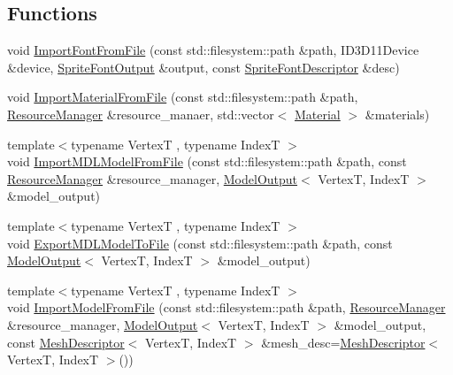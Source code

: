 \subsection*{Functions}
\begin{DoxyCompactItemize}
\item 
void \mbox{\hyperlink{namespacemage_1_1rendering_1_1loader_afe2f4738fcca02efc8be6b0f022d5ee0}{Import\+Font\+From\+File}} (const std\+::filesystem\+::path \&path, I\+D3\+D11\+Device \&device, \mbox{\hyperlink{structmage_1_1rendering_1_1_sprite_font_output}{Sprite\+Font\+Output}} \&output, const \mbox{\hyperlink{classmage_1_1rendering_1_1_sprite_font_descriptor}{Sprite\+Font\+Descriptor}} \&desc)
\item 
void \mbox{\hyperlink{namespacemage_1_1rendering_1_1loader_ae3985a3a98ac4dce859d735cf34ad0b9}{Import\+Material\+From\+File}} (const std\+::filesystem\+::path \&path, \mbox{\hyperlink{classmage_1_1rendering_1_1_resource_manager}{Resource\+Manager}} \&resource\+\_\+manaer, std\+::vector$<$ \mbox{\hyperlink{classmage_1_1rendering_1_1_material}{Material}} $>$ \&materials)
\item 
{\footnotesize template$<$typename VertexT , typename IndexT $>$ }\\void \mbox{\hyperlink{namespacemage_1_1rendering_1_1loader_a1a3ecaaed66271510e1790af5ad37d31}{Import\+M\+D\+L\+Model\+From\+File}} (const std\+::filesystem\+::path \&path, const \mbox{\hyperlink{classmage_1_1rendering_1_1_resource_manager}{Resource\+Manager}} \&resource\+\_\+manager, \mbox{\hyperlink{structmage_1_1rendering_1_1_model_output}{Model\+Output}}$<$ VertexT, IndexT $>$ \&model\+\_\+output)
\item 
{\footnotesize template$<$typename VertexT , typename IndexT $>$ }\\void \mbox{\hyperlink{namespacemage_1_1rendering_1_1loader_a32ddddf4a3e11604675f31c1cf901ad1}{Export\+M\+D\+L\+Model\+To\+File}} (const std\+::filesystem\+::path \&path, const \mbox{\hyperlink{structmage_1_1rendering_1_1_model_output}{Model\+Output}}$<$ VertexT, IndexT $>$ \&model\+\_\+output)
\item 
{\footnotesize template$<$typename VertexT , typename IndexT $>$ }\\void \mbox{\hyperlink{namespacemage_1_1rendering_1_1loader_a891fd49b703e85d139c5aa4bdf91ba4f}{Import\+Model\+From\+File}} (const std\+::filesystem\+::path \&path, \mbox{\hyperlink{classmage_1_1rendering_1_1_resource_manager}{Resource\+Manager}} \&resource\+\_\+manager, \mbox{\hyperlink{structmage_1_1rendering_1_1_model_output}{Model\+Output}}$<$ VertexT, IndexT $>$ \&model\+\_\+output, const \mbox{\hyperlink{classmage_1_1rendering_1_1_mesh_descriptor}{Mesh\+Descriptor}}$<$ VertexT, IndexT $>$ \&mesh\+\_\+desc=\mbox{\hyperlink{classmage_1_1rendering_1_1_mesh_descriptor}{Mesh\+Descriptor}}$<$ VertexT, IndexT $>$())

\end{DoxyCompactItemize}
